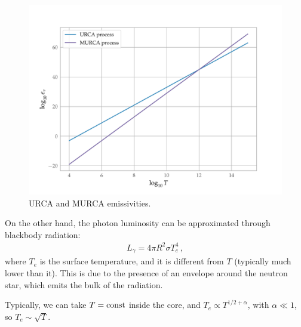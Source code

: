 \documentclass[main.tex]{subfiles}
\begin{document}
\begin{figure}[H]
\centering
\includegraphics[width=.7\textwidth]{figures/urca-murca}
\caption{URCA and MURCA emissivities.}
\label{fig:urca-murca}
\end{figure}

On the other hand, the photon luminosity can be approximated through blackbody radiation: 
%
\begin{align}
L_\gamma = 4 \pi R^2 \sigma T_e^4
\,,
\end{align}
%
where \(T_e\) is the surface temperature, and it is different from \(T\) (typically much lower than it). 
This is due to the presence of an envelope around the neutron star, which emits the bulk of the radiation. 

Typically, we can take \(T = \text{const}\) inside the core, and \(T_e \propto T^{1/2 + \alpha }\), with \(\alpha \ll 1\), so \(T_e \sim \sqrt{T}\).
\end{document}
